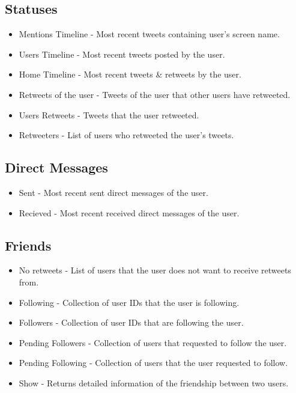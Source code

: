 \documentclass{article}
\begin{document}
	\subsection{Statuses}
	\begin{itemize}
		\item{Mentions Timeline} - Most recent tweets containing user's screen name.
			
		\item{Users Timeline} - Most recent tweets posted by the user.
			
		\item{Home Timeline} - Most recent tweets \& retweets by the user.
			
		\item{Retweets of the user} - Tweets of the user that other users have retweeted.
			
		\item{Users Retweets} - Tweets that the user retweeted.
			
		\item{Retweeters} - List of users who retweeted the user's tweets.	
	\end{itemize}
	
	\subsection{Direct Messages}
	\begin{itemize}
		\item{Sent} - Most recent sent direct messages of the user.
		\item{Recieved} - Most recent received direct messages of the user.
	\end{itemize}
	
	\subsection{Friends}
	\begin{itemize}
		\item{No retweets} - List of users that the user does not want to receive retweets from.

		\item{Following} - Collection of user IDs that the user is following.

		\item{Followers} - Collection of user IDs that are following the user.

		\item{Pending Followers} - Collection of users that requested to follow the user.

		\item{Pending Following} - Collection of users that the user requested to follow.

		\item{Show} - Returns detailed information of the friendship between two users.
	\end{itemize}
\end{document}
